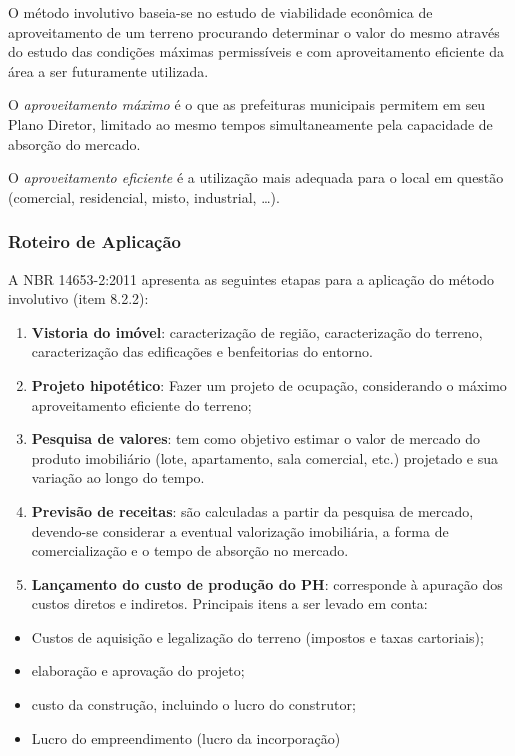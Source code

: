 \documentclass[
  10pt,
  a4paper]{article}
\providecommand{\tightlist}{%
  \setlength{\itemsep}{0pt}\setlength{\parskip}{0pt}}
\begin{document}
O método involutivo baseia-se no estudo de viabilidade econômica de
aproveitamento de um terreno procurando determinar o valor do mesmo
através do estudo das condições máximas permissíveis e com
aproveitamento eficiente da área a ser futuramente utilizada.

O \emph{aproveitamento máximo} é o que as prefeituras municipais
permitem em seu Plano Diretor, limitado ao mesmo tempos simultaneamente
pela capacidade de absorção do mercado.

O \emph{aproveitamento eficiente} é a utilização mais adequada para o
local em questão (comercial, residencial, misto, industrial, \ldots).

\subsubsection{Roteiro de Aplicação}\label{roteiro-de-aplicauxe7uxe3o}

A NBR 14653-2:2011 apresenta as seguintes etapas para a aplicação do
método involutivo (item 8.2.2):

\begin{enumerate}
\def\labelenumi{\alph{enumi}.}
\tightlist
\item
  \textbf{Vistoria do imóvel}: caracterização de região, caracterização
  do terreno, caracterização das edificações e benfeitorias do entorno.
\item
  \textbf{Projeto hipotético}: Fazer um projeto de ocupação,
  considerando o máximo aproveitamento eficiente do terreno;
\item
  \textbf{Pesquisa de valores}: tem como objetivo estimar o valor de
  mercado do produto imobiliário (lote, apartamento, sala comercial,
  etc.) projetado e sua variação ao longo do tempo.
\item
  \textbf{Previsão de receitas}: são calculadas a partir da pesquisa de
  mercado, devendo-se considerar a eventual valorização imobiliária, a
  forma de comercialização e o tempo de absorção no mercado.
\item
  \textbf{Lançamento do custo de produção do PH}: corresponde à apuração
  dos custos diretos e indiretos. Principais itens a ser levado em
  conta:
\end{enumerate}

\begin{itemize}
\tightlist
\item
  Custos de aquisição e legalização do terreno (impostos e taxas
  cartoriais);
\item
  elaboração e aprovação do projeto;
\item
  custo da construção, incluindo o lucro do construtor;
\item
  Lucro do empreendimento (lucro da incorporação)
\end{itemize}
\end{document}
